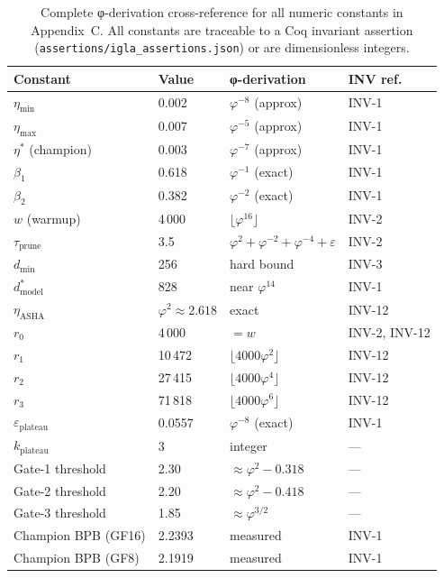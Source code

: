 \begin{table}[h]
\centering
\begin{tabular}{llll}
\toprule
\textbf{Constant} & \textbf{Value} & \textbf{φ-derivation} &
\textbf{INV ref.} \\
\midrule
$\eta_{\min}$           & 0.002 & $\varphi^{-8}$ (approx)  & INV-1 \\
$\eta_{\max}$           & 0.007 & $\varphi^{-5}$ (approx)  & INV-1 \\
$\eta^*$ (champion)     & 0.003 & $\varphi^{-7}$ (approx)  & INV-1 \\
$\beta_1$               & 0.618 & $\varphi^{-1}$ (exact)   & INV-1 \\
$\beta_2$               & 0.382 & $\varphi^{-2}$ (exact)   & INV-1 \\
$w$ (warmup)            & 4\,000 & $\lfloor\varphi^{16}\rfloor$ & INV-2 \\
$\tau_{\text{prune}}$   & 3.5   & $\varphi^2+\varphi^{-2}+\varphi^{-4}+\varepsilon$
                                                            & INV-2 \\
$d_{\min}$              & 256   & hard bound               & INV-3 \\
$d_\text{model}^*$      & 828   & near $\varphi^{14}$      & INV-1 \\
$\eta_{\text{ASHA}}$    & $\varphi^2 \approx 2.618$ & exact & INV-12 \\
$r_0$                   & 4\,000 & $= w$                   & INV-2, INV-12 \\
$r_1$                   & 10\,472 & $\lfloor 4000\varphi^2\rfloor$ & INV-12 \\
$r_2$                   & 27\,415 & $\lfloor 4000\varphi^4\rfloor$ & INV-12 \\
$r_3$                   & 71\,818 & $\lfloor 4000\varphi^6\rfloor$ & INV-12 \\
$\varepsilon_{\text{plateau}}$ & 0.0557 & $\varphi^{-8}$ (exact) & INV-1 \\
$k_{\text{plateau}}$    & 3     & integer                  & --- \\
Gate-1 threshold        & 2.30  & $\approx \varphi^2 - 0.318$ & --- \\
Gate-2 threshold        & 2.20  & $\approx \varphi^2 - 0.418$ & --- \\
Gate-3 threshold        & 1.85  & $\approx \varphi^{3/2}$     & --- \\
Champion BPB (GF16)     & 2.2393 & measured                 & INV-1 \\
Champion BPB (GF8)      & 2.1919 & measured                 & INV-1 \\
\bottomrule
\end{tabular}
\caption{Complete φ-derivation cross-reference for all numeric constants
in Appendix~C.  All constants are traceable to a Coq invariant assertion
(\texttt{assertions/igla\_assertions.json}) or are dimensionless integers.}
\end{table}

